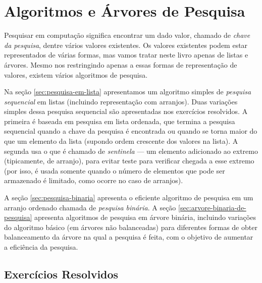 \chapter{Algoritmos e Árvores de Pesquisa}
\label{algoritmos-de-pesquisa}

Pesquisar em computação significa encontrar um dado valor, chamado de
{\em chave da pesquisa\/}, dentre vários valores existentes. Os
valores existentes podem estar representados de várias formas, mas
vamos tratar neste livro apenas de listas e árvores.  Mesmo nos
restringindo apenas a essas formas de representação de valores,
existem vários algoritmos de pesquisa. 

Na seção \ref{sec:pesquisa-em-lista} apresentamos um algoritmo simples
de {\em pesquisa sequencial\/} em listas (incluindo representação com
arranjos). Duas variações simples dessa pesquisa sequencial são
apresentadas nos exercícios resolvidos. A primeira é baseada em
pesquisa em lista ordenada, que termina a pesquisa sequencial quando a
chave da pesquisa é encontrada ou quando se torna maior do que um
elemento da lista (supondo ordem crescente dos valores na lista). A
segunda usa o que é chamado de {\em sentinela} --- um elemento
adicionado ao extremo (tipicamente, de arranjo), para evitar teste
para verificar chegada a esse extremo (por isso, é usada somente
quando o número de elementos que pode ser armazenado é limitado, como
ocorre no caso de arranjos).

A seção \ref{sec:pesquisa-binaria} apresenta o eficiente algoritmo de
pesquisa em um arranjo ordenado chamada de {\em pesquisa binária}.  A
seção \ref{sec:arvore-binaria-de-pesquisa} apresenta algoritmos de
pesquisa em árvore binária, incluindo variações do algoritmo básico
(em árvores não balanceadas) para diferentes formas de obter
balanceamento da árvore na qual a pesquisa é feita, com o objetivo de
aumentar a eficiência da pesquisa.







\section{Exercícios Resolvidos}

